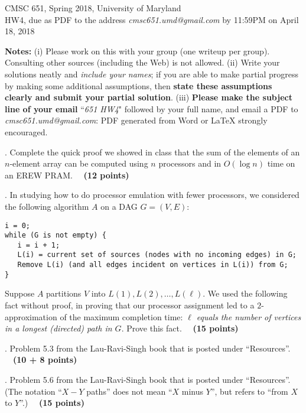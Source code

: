 \documentclass{article}[11pt]
\begin{document}
\newcommand{\E}{\textbf{E}}
\newcommand{\var}{\textbf{var}}

\begin{center}
CMSC 651, Spring 2018, University of Maryland \\
HW4, due as PDF to the address \emph{cmsc651.umd@gmail.com} by 11:59PM on April 18, 2018
\end{center}

\medskip \noindent
\textbf{Notes:} (i) Please work on this with your group (one writeup per group). Consulting
other sources (including the Web) is not allowed. 
(ii) Write your solutions neatly and \emph{include your names}; if you are able to make partial progress by making some
additional assumptions, then \textbf{state these assumptions clearly and submit
your partial solution}. 
(iii) \textbf{Please make the subject line of your email} ``\textit{651 HW4}" followed by
your full name, and email a PDF to \emph{cmsc651.umd@gmail.com}: PDF generated from Word or LaTeX strongly encouraged. 

 
\medskip {}. Complete the quick proof we showed in class that the sum of the elements of an $n$-element array can be computed using $n$ processors and in $O(\log n)$ time on an EREW PRAM. ~~\textbf{(12 points)}

\medskip \smallskip {}. In studying how to do processor emulation with fewer processors, we considered the following algorithm $A$ on a DAG $G = (V,E)$:

\begin{verbatim}
i = 0;
while (G is not empty) {
   i = i + 1;
   L(i) = current set of sources (nodes with no incoming edges) in G;
   Remove L(i) (and all edges incident on vertices in L(i)) from G;
}
\end{verbatim}
Suppose $A$ partitions $V$ into $L(1), L(2), \ldots, L(\ell)$. We used the following fact without proof, in proving that our processor assignment led to a $2$-approximation of the maximum completion time: \emph{$\ell$ equals the number of vertices in a longest (directed) path in $G$}. Prove this fact.
 ~~\textbf{(15 points)}

\medskip {}. Problem 5.3 from the Lau-Ravi-Singh book that is posted under ``Resources''.
~~\textbf{(10 + 8 points)}

\medskip {}. Problem 5.6 from the Lau-Ravi-Singh book that is posted under ``Resources''. (The notation ``$X - Y$ paths'' does not mean ``$X$ minus $Y$'', but refers to ``from $X$ to $Y$''.) 
~~\textbf{(15 points)}
\end{document}
